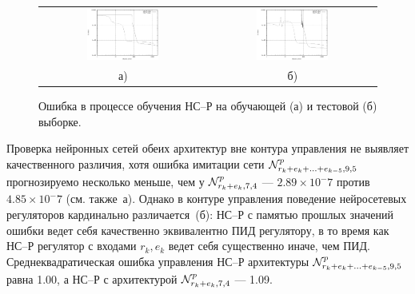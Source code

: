 \begin{figure}
  \centering
  \begin{tabular}{cc}
    \includegraphics[width=0.45\textwidth,%
      totalheight=0.25\textheight]{cstr_e5r1_vs_e1r1_training_learn_rus}
    &
    \includegraphics[width=0.45\textwidth,%
      totalheight=0.25\textheight]{cstr_e5r1_vs_e1r1_training_test_rus} \\
    а) & б)
  \end{tabular}
  \caption{Ошибка в процессе обучения НС--Р на обучающей (а) и тестовой (б) выборке.}%
  \label{fig:cstr_e5r1_vs_e1r1_training}
\end{figure}

Проверка нейронных сетей обеих архитектур вне контура управления не
выявляет качественного различия, хотя ошибка имитации сети
$\mathcal{N}^p_{r_k+e_k+\ldots+e_{k-5},9,5}$ прогнозируемо несколько меньше,
чем у $\mathcal{N}^p_{r_k+e_k,7,4}$ --- $2.89\times 10^-7$ против $4.85\times
10^-7$ (см. также~а).  Однако в
контуре управления поведение нейросетевых регуляторов кардинально
различается~(б): НС--Р с памятью
прошлых значений ошибки ведет себя качественно эквивалентно ПИД
регулятору, в то время как НС--Р регулятор с входами $r_k,e_k$ ведет
себя существенно иначе, чем ПИД.  Среднеквадратическая ошибка
управления НС--Р архитектуры $\mathcal{N}^p_{r_k+e_k+\ldots+e_{k-5},9,5}$
равна 1.00, а НС--Р с архитектурой $\mathcal{N}^p_{r_k+e_k,7,4}$ --- 1.09.

